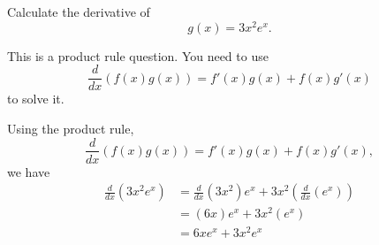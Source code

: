 \documentclass{ximera}
\author{Emma Smith Zbarsky}
\begin{document}
\begin{exercise}

Calculate the derivative of \[g(x) = 3x^2e^x.\]


\begin{hint}
This is a product rule question. You need to use
\[\frac{d}{dx}\left(f(x)g(x)\right) = f'(x)g(x)+f(x)g'(x)\] to solve it.
\end{hint}


\begin{hint}
Using the product rule,
\[\frac{d}{dx}\left(f(x)g(x)\right) = f'(x)g(x)+f(x)g'(x),\] we have
\begin{align*} \frac{d}{dx}\left(3x^2e^x\right) &= \frac{d}{dx}\left(3x^2\right)e^x + 3x^2\left(\frac{d}{dx}\left(e^x\right)\right) \\
&= \left(6x\right)e^x + 3x^2\left(e^x\right) \\
&= \boxed{6xe^x+3x^2e^x}
\end{align*}
\end{hint}


\begin{multipleChoice}
\end{multipleChoice}

\end{exercise}
\end{document}
